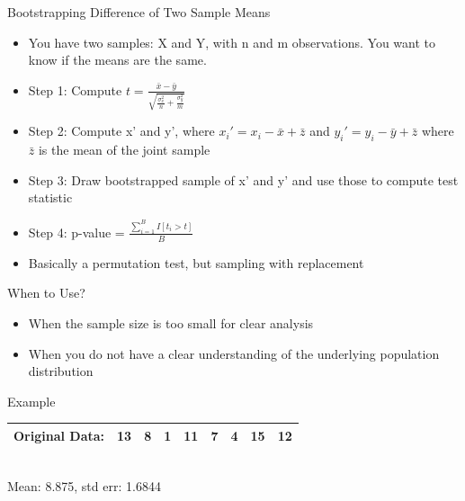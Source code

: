 \begin{frame}{Bootstrapping Difference of Two Sample Means}
    \begin{itemize}
        \item You have two samples: X and Y, with n and m observations. You want to know if the means are the same.
        \item Step 1: Compute $t=\frac{\bar{x}-\bar{y}}{\sqrt{\frac{\sigma_{x}^2}{n}+ \frac{\sigma_{y}^2}{m}}}$
        \item Step 2: Compute x' and y', where $x_i' = x_i - \bar{x} + \bar{z}$ and $y_i' = y_i - \bar{y} + \bar{z}$ where $\bar{z}$ is the mean of the joint sample
        \item Step 3: Draw bootstrapped sample of x' and y' and use those to compute test statistic
        \item Step 4: p-value = $\frac{\sum_{i=1}^{B}I[t_{i}>t]}{B}$
        \item Basically a permutation test, but sampling with replacement
    \end{itemize}
\end{frame}

\begin{frame}{When to Use?}
    \begin{itemize}
        \item When the sample size is too small for clear analysis
        \item When you do not have a clear understanding of the underlying population distribution
    \end{itemize}
\end{frame}

\begin{frame}{Example}
    \begin{tabular}{|c|c|c|c|c|c|c|c|c|}
        \hline
        Original Data: & 13 & 8 & 1 & 11 & 7 & 4 & 15 & 12\\
        \hline
    \end{tabular} \\
\vspace{0.25in}
Mean: 8.875, std err: 1.6844
\end{frame}

